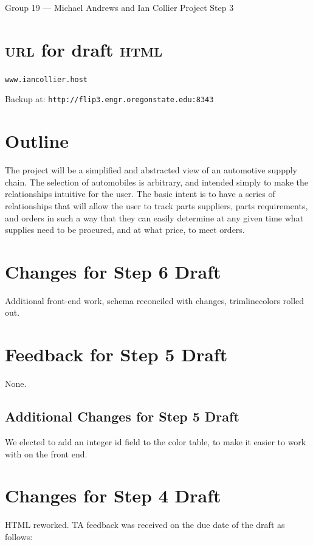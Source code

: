 \documentclass[11pt,letterpaper,oneside]{amsart}
\begin{document}
Group 19 --- Michael Andrews and Ian Collier
Project Step 3

\section*{\textsc{url} for draft \textsc{html}}

\texttt{www.iancollier.host}

Backup at: \texttt{http://flip3.engr.oregonstate.edu:8343}

\section*{Outline}

The project will be a simplified and abstracted view of an automotive suppply chain.  The selection of automobiles is arbitrary, and intended simply to make the relationships intuitive for the user.  The basic intent is to have a series of relationships that will allow the user to track parts suppliers, parts requirements, and orders in such a way that they can easily determine at any given time what supplies need to be procured, and at what price, to meet orders.

\section*{Changes for Step 6 Draft}

Additional front-end work, schema reconciled with changes, trimline\textunderscore colors rolled out.

\section*{Feedback for Step 5 Draft}

None.

\subsection*{Additional Changes for Step 5 Draft}

We elected to add an integer id field to the color table, to make it easier to work with on the front end.


\section*{Changes for Step 4 Draft}

HTML reworked.  TA feedback was received on the due date of the draft as follows:
\end{document}
